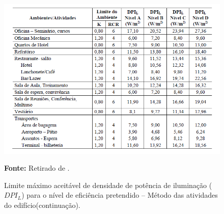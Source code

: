 \documentclass[12pt, openright, oneside, a4paper, english, brazil]{abntex2}   %
\begin{document}
\begin{figure}[H]
\centering
\includegraphics[width = 1.1\textwidth]{Figuras/tab1_3.PNG}
\caption{Limite máximo aceitável de densidade de potência de iluminação ($DPI_L$) para o nível de eficiência pretendido – Método das atividades do edifício(continuação).}
\label{tab2_3}
\textbf{Fonte:} Retirado de \cite{RTQ-C}.
\end{figure}





\end{document}
